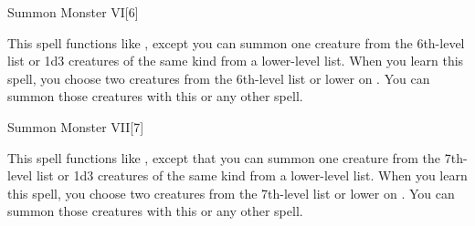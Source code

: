 \begin{spellsection}{Summon Monster VI}[6]
    \begin{spellheader}
    \end{spellheader}
    \begin{spellcontent}
        \begin{spelltargetinginfo}
        \end{spelltargetinginfo}
        \begin{spelleffects}
            \spellspecial This spell functions like , except you can summon one creature from the 6th-level list or 1d3 creatures of the same kind from a lower-level list. When you learn this spell, you choose two creatures from the 6th-level list or lower on . You can summon those creatures with this or any other  spell.
            \spelldur \durshort \dismissable
        \end{spelleffects}
    \end{spellcontent}
    \begin{spellfooter}
        \miscastexplode
    \end{spellfooter}
\end{spellsection}

\begin{spellsection}{Summon Monster VII}[7]
    \begin{spellheader}
    \end{spellheader}
    \begin{spellcontent}
        \begin{spelltargetinginfo}
        \end{spelltargetinginfo}
        \begin{spelleffects}
            \spellspecial This spell functions like , except that you can summon one creature from the 7th-level list or 1d3 creatures of the same kind from a lower-level list. When you learn this spell, you choose two creatures from the 7th-level list or lower on . You can summon those creatures with this or any other  spell.
            \spelldur \durshort \dismissable
        \end{spelleffects}
    \end{spellcontent}
    \begin{spellfooter}
        \miscastexplode
    \end{spellfooter}
\end{spellsection}


